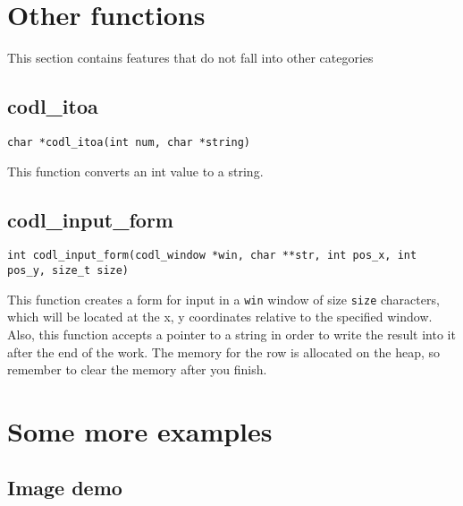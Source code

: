 \documentclass{article}
\newcommand{\fstep}{\vspace{3mm}\noindent}
\begin{document}
\section{Other functions}
This section contains features that do not fall into other categories

\subsection{codl\_itoa}
{\tt char *codl\_itoa(int num, char *string)}

\fstep{} This function converts an int value to a string.

\subsection{codl\_input\_form}
{\tt int codl\_input\_form(codl\_window *win, char **str, int pos\_x, int pos\_y, size\_t size)}

\fstep{} This function creates a form for input in a {\tt win} window of size {\tt size}
characters, which will be located at the x, y coordinates relative to the specified
window. Also, this function accepts a pointer to a string in order to write the
result into it after the end of the work. The memory for the row is allocated on
the heap, so remember to clear the memory after you finish.

\newpage

\section{Some more examples}

\subsection{Image demo}
\end{document}
